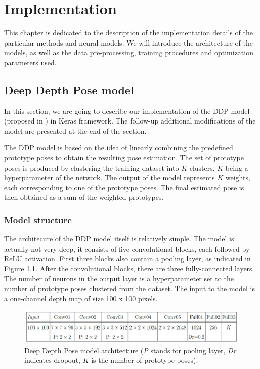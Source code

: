 \chapter{Implementation}\label{chap:implementation}
This chapter is dedicated to the description of the implementation details of the particular methods and neural models. We will introduce the architecture of the models, as well as the data pre-processing, training procedures and optimization parameters used.

\section{Deep Depth Pose model}
In this section, we are going to describe our implementation of the DDP model (proposed in \cite{Marin18jvcir}) in Keras framework. The follow-up additional modifications of the model are presented at the end of the section.\par
\vspace{5mm}
\noindent
The DDP model is based on the idea of linearly combining the predefined prototype poses to obtain the resulting pose estimation. The set of prototype poses is produced by clustering the training dataset into $K$ clusters, $K$ being a hyperparameter of the network. The output of the model represents $K$ weights, each corresponding to one of the prototype poses. The final estimated pose is then obtained as a sum of the weighted prototypes.


\subsection{Model structure}

The architecure of the DDP model itself is relatively simple. The model is actually not very deep, it consists of five convolutional blocks, each followed by ReLU activation. First three blocks also contain a pooling layer, as indicated in Figure \ref{fig:ddp}. After the convolutional blocks, there are three fully-connected layers. The number of neurons in the output layer is a hyperparameter set to the number of prototype poses clustered from the dataset. The input to the model is a one-channel depth map of size 100 x 100 pixels.\par

\vspace{5mm}
\begin{figure}[H]
\begin{center}
  \includegraphics[width=\textwidth]{images/implementation/ddp.PNG}
  \caption[Deep Depth Pose model architecture \cite{Marin18jvcir}.]{Deep Depth Pose model architecture \cite{Marin18jvcir} (\textit{P} stands for pooling layer, \textit{Dr} indicates dropout, $K$ is the number of prototype poses).}
  \label{fig:ddp}
\end{center}
\end{figure}


